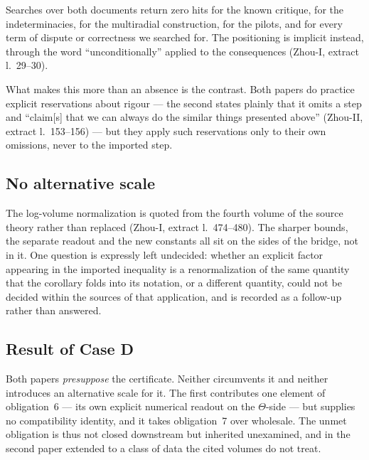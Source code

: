 \documentclass[11pt,a4paper]{article}
\theoremstyle{definition}
\newcommand{\anchor}[2]{(#1, extract l.~#2)}
\begin{document}
Searches over both documents return zero hits for the known critique, for the
indeterminacies, for the multiradial construction, for the pilots, and for every
term of dispute or correctness we searched for. The positioning is implicit
instead, through the word ``unconditionally'' applied to the consequences
\anchor{Zhou-I}{29--30}.

What makes this more than an absence is the contrast. Both papers do practice
explicit reservations about rigour --- the second states plainly that it omits a
step and ``claim[s] that we can always do the similar things presented above''
\anchor{Zhou-II}{153--156} --- but they apply such reservations only to their own
omissions, never to the imported step.

\subsection{No alternative scale}

The log-volume normalization is quoted from the fourth volume of the source theory
rather than replaced \anchor{Zhou-I}{474--480}. The sharper bounds, the separate
readout and the new constants all sit on the sides of the bridge, not in it. One
question is expressly left undecided: whether an explicit factor appearing in the
imported inequality is a renormalization of the same quantity that the corollary
folds into its notation, or a different quantity, could not be decided within the
sources of that application, and is recorded as a follow-up rather than answered.

\subsection{Result of Case D}

Both papers \emph{presuppose} the certificate. Neither circumvents it and neither
introduces an alternative scale for it. The first contributes one element of
obligation~6 --- its own explicit numerical readout on the $\Theta$-side --- but
supplies no compatibility identity, and it takes obligation~7 over wholesale. The unmet obligation is thus not closed downstream
but inherited unexamined, and in the second paper extended to a class of data the
cited volumes do not treat.
\end{document}
